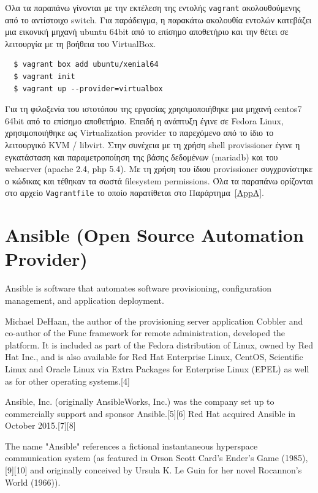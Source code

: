 \documentclass[12pt]{report}
\begin{document}
Όλα τα παραπάνω γίνονται με την εκτέλεση της εντολής \textlatin{\texttt{vagrant}} ακολουθούμενης από το αντίστοιχο \textlatin{switch}. Για παράδειγμα, η παρακάτω ακολουθία εντολών κατεβάζει μια εικονική μηχανή \textlatin{ubuntu 64bit} από το επίσημο αποθετήριο και την θέτει σε λειτουργία με τη βοήθεια του \textlatin{VirtualBox}.
\begin{Verbatim}
  $ vagrant box add ubuntu/xenial64
  $ vagrant init
  $ vagrant up --provider=virtualbox
\end{Verbatim}

Για τη φιλοξενία του ιστοτόπου της εργασίας χρησιμοποιήθηκε μια μηχανή \textlatin{centos7 64bit} από το επίσημο αποθετήριο. Επειδή η ανάπτυξη έγινε σε \textlatin{Fedora Linux}, χρησιμοποιήθηκε ως \textlatin{Virtualization provider} το παρεχόμενο από το ίδιο το λειτουργικό \textlatin{KVM / libvirt}. Στην συνέχεια με τη χρήση \textlatin{shell provissioner} έγινε η εγκατάσταση και παραμετροποίηση της βάσης δεδομένων (\textlatin{mariadb}) και του \textlatin{webserver (apache 2.4, php 5.4)}. Με τη χρήση του ίδιου \textlatin{provissioner} συγχρονίστηκε ο κώδικας και τέθηκαν τα σωστά \textlatin{filesystem permissions}.
Όλα τα παραπάνω ορίζονται στο αρχείο \textlatin{\texttt{Vagrantfile}} το οποίο παρατίθεται στο Παράρτημα~\ref{AppA}.

\section{\textlatin{Ansible (Open Source Automation Provider)}}\label{ansible}
Ansible is software that automates software provisioning, configuration management, and application deployment.~\cite{geerling_2015}

Michael DeHaan, the author of the provisioning server application Cobbler and co-author of the Func framework for remote administration, developed the platform. It is included as part of the Fedora distribution of Linux, owned by Red Hat Inc., and is also available for Red Hat Enterprise Linux, CentOS, Scientific Linux and Oracle Linux via Extra Packages for Enterprise Linux (EPEL) as well as for other operating systems.[4]

Ansible, Inc. (originally AnsibleWorks, Inc.) was the company set up to commercially support and sponsor Ansible.[5][6] Red Hat acquired Ansible in October 2015.[7][8]

The name "Ansible" references a fictional instantaneous hyperspace communication system (as featured in Orson Scott Card's Ender's Game (1985),[9][10] and originally conceived by Ursula K. Le Guin for her novel Rocannon's World (1966)).
\end{document}
